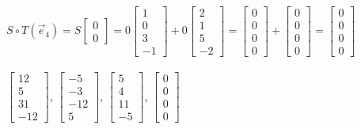 \documentclass{article}
\begin{document}
\\
$S {\circ} T (\vec{e}_{4}) = 
S \begin{bmatrix} 0 \\ 0 \end{bmatrix} =
0 \begin{bmatrix} 1 \\ 0 \\3 \\ -1 \end{bmatrix} + 
0 \begin{bmatrix} 2 \\ 1 \\ 5\\ -2 \end{bmatrix} = \begin{bmatrix} 0 \\ 0 \\0 \\ 0 \end{bmatrix} + 
\begin{bmatrix} 0 \\ 0 \\ 0 \\ 0 \end{bmatrix} = \begin{bmatrix} 0 \\ 0 \\ 0 \\ 0 \end{bmatrix}$\\
\\
$\begin{bmatrix} 12 \\ 5 \\31 \\ -12 \end{bmatrix}$, 
$\begin{bmatrix} -5 \\ -3 \\ -12 \\ 5 \end{bmatrix}$, 
$\begin{bmatrix} 5 \\ 4 \\ 11 \\ -5 \end{bmatrix}$,
$\begin{bmatrix} 0 \\ 0 \\ 0 \\ 0 \end{bmatrix}$\\
\end{document}
